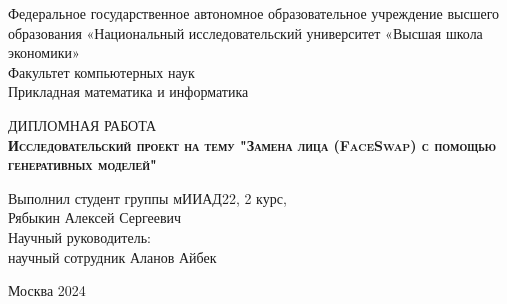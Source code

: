 \begin{titlepage}
\newpage

{
\begin{center}
    Федеральное государственное автономное образовательное учреждение высшего образования «Национальный исследовательский университет «Высшая школа экономики»
\\
\bigskip
Факультет компьютерных наук \\
Прикладная математика и информатика \\
\end{center}
}

\vspace{8em}

\begin{center}
{\Large ДИПЛОМНАЯ РАБОТА}\\
\textsc{\textbf{
Исследовательский проект на тему
\linebreak
"Замена лица (FaceSwap) с помощью генеративных моделей"}}

\end{center}

\vspace{2em}

{
\hfill\parbox{16cm}{
\hspace*{5cm}\hspace*{-5cm}Выполнил студент группы мИИАД22, 2 курс,\\
 Рябыкин Алексей Сергеевич\\
 
\hspace*{5cm}\hspace*{-5cm}Научный руководитель:\\
научный сотрудник Аланов Айбек \\


}
}

\vspace{\fill}

\begin{center}
Москва 2024
\end{center}

\end{titlepage}